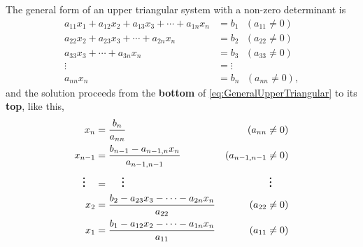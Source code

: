 \documentclass[letterpaper]{book}
\begin{document}
The general form of an upper triangular system with a non-zero determinant is
\begin{equation}
\label{eq:GeneralUpperTriangular}
    \begin{aligned}
     a_{11} x_1 + a_{12} x_2 + a_{13} x_3+ \cdots +  a_{1n} x_n &=b_1 ~~~(a_{11} \neq 0)\\
     a_{22} x_2 + a_{23} x_3 + \cdots +  a_{2n} x_n &=b_2 ~~~(a_{22} \neq 0)\\
       a_{33} x_3 + \cdots +  a_{3n} x_n &=b_3 ~~~(a_{33} \neq 0)\\
     \vdots &= \vdots \\
     a_{nn} x_n &= b_n  ~~~(a_{nn} \neq 0),
    \end{aligned}
\end{equation}
and the solution proceeds from the \textbf{bottom} of \eqref{eq:GeneralUpperTriangular} to its \textbf{top}, like this,
\begin{equation}
    \begin{aligned}
    x_n &= \frac{b_n}{a_{nn}}  &(a_{nn} \neq 0) \medskip \\
     x_{n-1}  &= \frac{b_{n-1}- a_{n-1,n} x_n}{a_{n-1,n-1}}  &(a_{n-1,n-1} \neq 0)\\
       \boldmath \vdots \unboldmath~~~ &=~~~~  \boldmath \vdots \unboldmath &  \boldmath \vdots \unboldmath~~~~~ \\
        x_2 &= \frac{b_2-  a_{23} x_3 - \cdots -  a_{2n} x_n}{a_{22}} &(a_{22} \neq 0)\\
      x_1  &=\frac{b_1- a_{12} x_2 - \cdots -  a_{1n} x_n}{a_{11}} &(a_{11} \neq 0)
    \end{aligned}
\end{equation}
\end{document}
